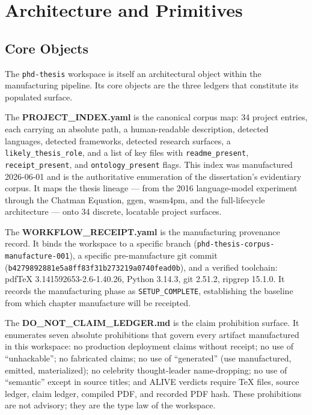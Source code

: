 
\section{Architecture and Primitives}
\label{sec:phd-thesis-arch}

\subsection{Core Objects}
\label{sec:phd-thesis-arch-objects}

The \texttt{phd-thesis} workspace is itself an architectural object within the manufacturing
pipeline. Its core objects are the three ledgers that constitute its populated surface.

The \textbf{PROJECT\_INDEX.yaml} is the canonical corpus map: 34 project entries, each
carrying an absolute path, a human-readable description, detected languages, detected
frameworks, detected research surfaces, a \texttt{likely\_thesis\_role}, and a list of key
files with \texttt{readme\_present}, \texttt{receipt\_present}, and
\texttt{ontology\_present} flags. This index was manufactured 2026-06-01 and is the
authoritative enumeration of the dissertation's evidentiary corpus. It maps the thesis
lineage --- from the 2016 language-model experiment through the Chatman Equation, ggen, wasm4pm,
and the full-lifecycle architecture --- onto 34 discrete, locatable project surfaces.

The \textbf{WORKFLOW\_RECEIPT.yaml} is the manufacturing provenance record. It binds the
workspace to a specific branch (\texttt{phd-thesis-corpus-manufacture-001}), a specific
pre-manufacture git commit (\texttt{b4279892881e5a8ff83f31b273219a0740fead0b}), and a
verified toolchain: pdfTeX 3.141592653-2.6-1.40.26, Python 3.14.3, git 2.51.2, ripgrep 15.1.0.
It records the manufacturing phase as \texttt{SETUP\_COMPLETE}, establishing the baseline
from which chapter manufacture will be receipted.

The \textbf{DO\_NOT\_CLAIM\_LEDGER.md} is the claim prohibition surface. It enumerates
seven absolute prohibitions that govern every artifact manufactured in this workspace: no
production deployment claims without receipt; no use of ``unhackable''; no fabricated claims;
no use of ``generated'' (use manufactured, emitted, materialized); no celebrity
thought-leader name-dropping; no use of ``semantic'' except in source titles; and ALIVE
verdicts require TeX files, source ledger, claim ledger, compiled PDF, and recorded PDF hash.
These prohibitions are not advisory; they are the type law of the workspace.

